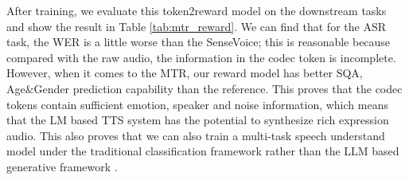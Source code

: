 \documentclass[a4paper]{article}
\begin{document}
After training, we evaluate this token2reward model on the downstream tasks \cite{commonvoice:2020, huang22f_interspeech, busso2008iemocap, chen2024airbench} and show the result in Table \ref{tab:mtr_reward}. We can find that for the ASR task, the WER is a little worse than the SenseVoice\cite{an2024funaudiollmvoiceunderstandinggeneration}; this is reasonable because compared with the raw audio, the information in the codec token is incomplete. However, when it comes to the MTR, our reward model has better SQA, Age\&Gender prediction capability than the reference\cite{reddy2022dnsmos, ma2024emoboxmultilingualmulticorpusspeech, Qwen-Audio}. 
This proves that the codec tokens contain sufficient emotion, speaker and noise information, which means that the LM based TTS system has the potential to synthesize rich expression audio. 
This also proves that we can also train a multi-task speech understand model under the traditional classification framework rather than the LLM based generative framework \cite{Qwen-Audio, chen2025minmomultimodallargelanguage}.


\end{document}
